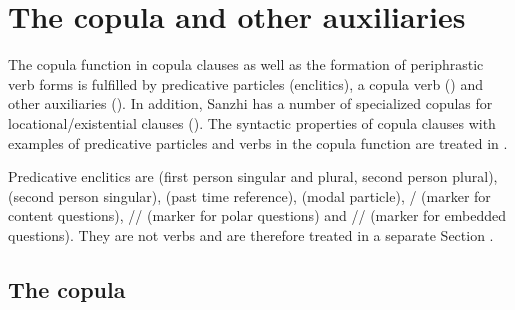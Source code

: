 \chapter{The copula and other auxiliaries}
\label{cpt:copulaotherauxiliaries}

The copula function in copula clauses as well as the formation of periphrastic verb forms is fulfilled by predicative particles (enclitics), a copula verb () and other auxiliaries (). In addition, Sanzhi has a number of specialized copulas for locational\slash existential clauses (). The syntactic properties of copula clauses with examples of predicative particles and verbs in the copula function are treated in .

Predicative enclitics are  (first person singular and plural, second person plural),  (second person singular),  (past time reference),  (modal particle), \slash{} (marker for content questions), \slash{}\slash{} (marker for polar questions) and  \slash{}\slash{} (marker for embedded questions). They are not verbs and are therefore treated in a separate Section .



\section{The copula}
\label{sec:The copula}

